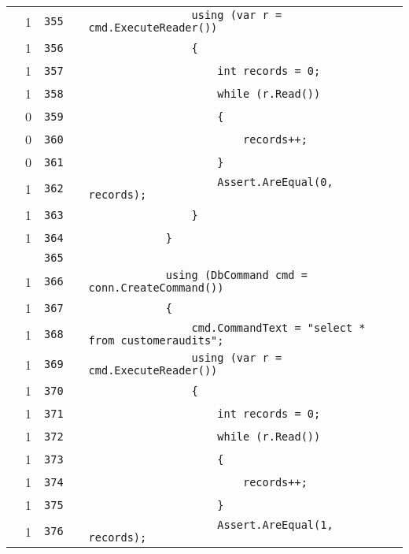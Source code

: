 \documentclass[a4paper,10pt]{article}
\begin{document}
\begin{longtable}[l]{lrrll}
\cellcolor{green} & 1 & \verb~355~ & & \verb~                using (var r = cmd.ExecuteReader())~\\
\cellcolor{green} & 1 & \verb~356~ & & \verb~                {~\\
\cellcolor{green} & 1 & \verb~357~ & & \verb~                    int records = 0;~\\
\cellcolor{green} & 1 & \verb~358~ & & \verb~                    while (r.Read())~\\
\cellcolor{red} & 0 & \verb~359~ & & \verb~                    {~\\
\cellcolor{red} & 0 & \verb~360~ & & \verb~                        records++;~\\
\cellcolor{red} & 0 & \verb~361~ & & \verb~                    }~\\
\cellcolor{green} & 1 & \verb~362~ & & \verb~                    Assert.AreEqual(0, records);~\\
\cellcolor{green} & 1 & \verb~363~ & & \verb~                }~\\
\cellcolor{green} & 1 & \verb~364~ & & \verb~            }~\\
\cellcolor{gray} &  & \verb~365~ & & \verb~~\\
\cellcolor{green} & 1 & \verb~366~ & & \verb~            using (DbCommand cmd = conn.CreateCommand())~\\
\cellcolor{green} & 1 & \verb~367~ & & \verb~            {~\\
\cellcolor{green} & 1 & \verb~368~ & & \verb~                cmd.CommandText = "select * from customeraudits";~\\
\cellcolor{green} & 1 & \verb~369~ & & \verb~                using (var r = cmd.ExecuteReader())~\\
\cellcolor{green} & 1 & \verb~370~ & & \verb~                {~\\
\cellcolor{green} & 1 & \verb~371~ & & \verb~                    int records = 0;~\\
\cellcolor{green} & 1 & \verb~372~ & & \verb~                    while (r.Read())~\\
\cellcolor{green} & 1 & \verb~373~ & & \verb~                    {~\\
\cellcolor{green} & 1 & \verb~374~ & & \verb~                        records++;~\\
\cellcolor{green} & 1 & \verb~375~ & & \verb~                    }~\\
\cellcolor{green} & 1 & \verb~376~ & & \verb~                    Assert.AreEqual(1, records);~\\

\end{longtable}
\end{document}
